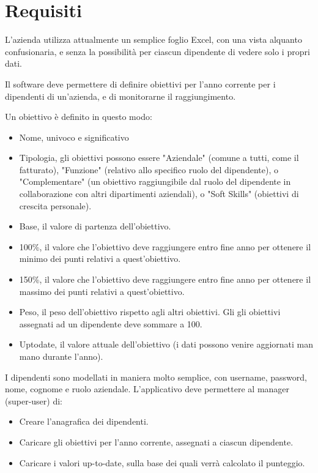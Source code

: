 \section*{Requisiti}

L'azienda utilizza attualmente un semplice foglio Excel, con una vista alquanto confusionaria, e senza la possibilità per ciascun dipendente di vedere solo i propri dati.

Il software deve permettere di definire obiettivi per l'anno corrente per i dipendenti di un'azienda, e di monitorarne il raggiungimento.

Un obiettivo è definito in questo modo:
\begin{itemize}
    \item Nome, univoco e significativo
    \item Tipologia, gli obiettivi possono essere "Aziendale" (comune a tutti, come il fatturato), "Funzione" (relativo allo specifico ruolo del dipendente), o "Complementare" (un obiettivo raggiungibile dal ruolo del dipendente in collaborazione con altri dipartimenti aziendali), o "Soft Skills" (obiettivi di crescita personale).
    \item Base, il valore di partenza dell'obiettivo.
    \item 100\%, il valore che l'obiettivo deve raggiungere entro fine anno per ottenere il minimo dei punti relativi a quest'obiettivo.
    \item 150\%, il valore che l'obiettivo deve raggiungere entro fine anno per ottenere il massimo dei punti relativi a quest'obiettivo.
    \item Peso, il peso dell'obiettivo rispetto agli altri obiettivi. Gli gli obiettivi assegnati ad un dipendente deve sommare a 100.
    \item Uptodate, il valore attuale dell'obiettivo (i dati possono venire aggiornati man mano durante l'anno).
\end{itemize}

I dipendenti sono modellati in maniera molto semplice, con username, password, nome, cognome e ruolo aziendale.
L'applicativo deve permettere al manager (super-user) di:

\begin{itemize}
    \item Creare l'anagrafica dei dipendenti.
    \item Caricare gli obiettivi per l'anno corrente, assegnati a ciascun dipendente.
    \item Caricare i valori up-to-date, sulla base dei quali verrà calcolato il punteggio.
\end{itemize}

